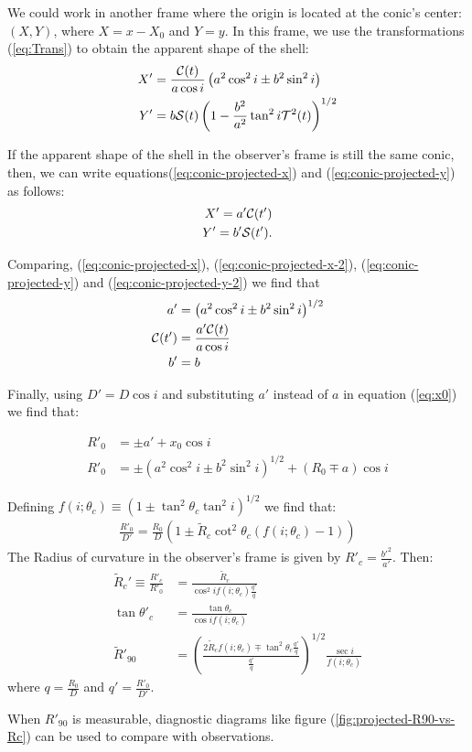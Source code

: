 We could work in another frame where the origin is located at the conic's center: $(X,Y)$, where $X=x-X_0$ and $Y=y$.
In this frame, we use the transformations (\ref{eq:Trans})  to obtain the apparent shape of the shell:
\begin{align}
X' &= \frac{\mathcal{C}(t)}{a\cos i}\left(a^2\cos^2 i \pm b^2\sin^2 i\right)  \label{eq:conic-projected-x}\\
Y' &= b\mathcal{S}(t)\left(1-\frac{b^2}{a^2}\tan^2 i\mathcal{T}^2(t)\right)^{1/2}
\label{eq:conic-projected-y}
\end{align}


If the apparent shape of the shell in the observer's frame is still the same conic, then, we
can write equations(\ref{eq:conic-projected-x}) and (\ref{eq:conic-projected-y}) as follows:
\begin{align}
X' = a'\mathcal{C}( t') \label{eq:conic-projected-x-2} \\
Y' = b'\mathcal{S} (t') \label{eq:conic-projected-y-2} . 
\end{align}

Comparing, (\ref{eq:conic-projected-x}), (\ref{eq:conic-projected-x-2}), (\ref{eq:conic-projected-y}) and (\ref{eq:conic-projected-y-2}) we find that
\begin{align}
a' &= \left(a^2\cos^2 i \pm b^2\sin^2 i\right)^{1/2} \\
\mathcal{C}(t') &= \frac{a'\mathcal{C}(t)}{a\cos i} \\
b' &= b \label{eq:b-prime}
\end{align} 

Finally, using $D' = D\cos i$ and substituting $a'$ instead of $a$ in equation (\ref{eq:x0}) we find that: 

\begin{align}
R'_0 &= \pm a' + x_0\cos i \\
R'_0 &= \pm\left(a^2\cos^2 i \pm b^2\sin^2 i\right)^{1/2} +  (R_0 \mp a)\cos i
\end{align}

Defining  $f(i;\theta_c)\equiv\left(1\pm\tan^2\theta_c\tan^2i\right)^{1/2}$ we find that:
\begin{align}
\frac{R'_0}{D'}=\frac{R_0}{D}\left(1\pm \tilde{R}_c\cot^2\theta_c(f(i;\theta_c)-1) \right)
\label{eq:qprime}
\end{align}
The Radius of curvature in the observer's frame is given by $R'_c=\frac{b'^2}{a'}$. Then:
\begin{align}
  \tilde{R}_c'\equiv  \frac{R'_c}{R'_0} &= \frac{\tilde{R}_c}{\cos^2 i f(i;\theta_c)\frac{q'}{q}}
  \label{eq:Aprime}\\
  \tan\theta'_c & = \frac{\tan\theta_c}{\cos i f(i;\theta_c)} \\
  \tilde{R}'_{90} &= \left(\frac{2\tilde{R}_cf(i;\theta_c) \mp \tan^2\theta_c\frac{q'}{q}}{\frac{q'}{q}}\right)^{1/2}\frac{\sec i}{f(i;\theta_c)}
\end{align}
where $q=\frac{R_0}{D}$ and $q' = \frac{R'_0}{D'}$.

When $R'_{90}$ is measurable, diagnostic diagrams like figure (\ref{fig:projected-R90-vs-Rc}) can be used to compare with observations.  



 


